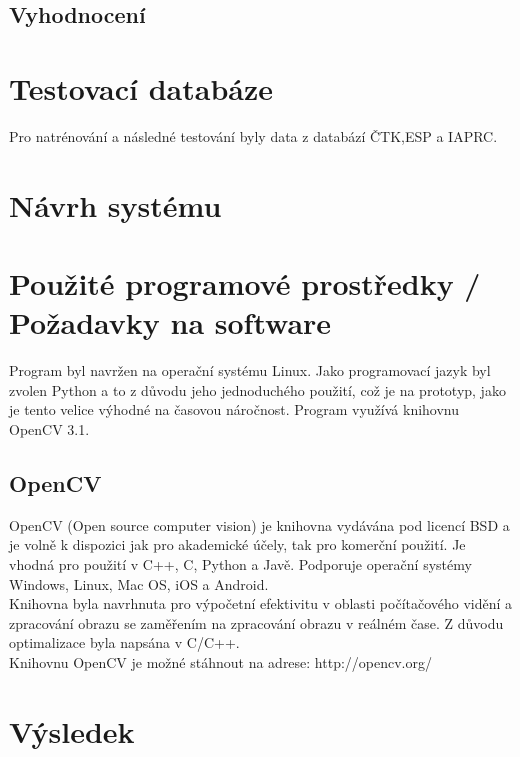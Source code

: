 \documentclass[czech,BP]{thesiskiv}
\begin{document}
\section{Vyhodnocení}

\chapter{Testovací databáze}
Pro natrénování a následné testování byly data z databází ČTK,ESP a IAPRC.
\chapter{Návrh systému}
\chapter{Použité programové prostředky / Požadavky na software}
Program byl navržen na operační systému Linux. Jako programovací jazyk byl zvolen Python a to z důvodu jeho jednoduchého použití, což je na prototyp, jako je tento velice výhodné na časovou náročnost. Program využívá knihovnu OpenCV 3.1.   
\section{OpenCV}
OpenCV (Open source computer vision) je knihovna vydávána pod licencí BSD a je volně k dispozici jak pro akademické účely, tak pro komerční použití. Je vhodná pro použití v C++, C, Python a Javě. Podporuje operační systémy Windows, Linux, Mac OS, iOS a Android.
\\
Knihovna byla navrhnuta pro výpočetní efektivitu v oblasti počítačového vidění a zpracování obrazu se zaměřením na zpracování obrazu v reálném čase. Z důvodu optimalizace byla napsána v C/C++. 
\\
Knihovnu OpenCV je možné stáhnout na adrese: http://opencv.org/
\\

\chapter{Výsledek}
\end{document}

